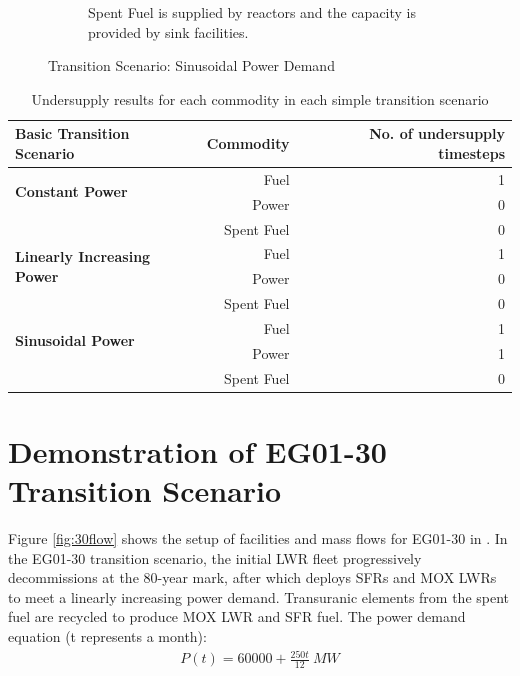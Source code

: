 \begin{figure}[]
\begin{subfigure}[t]{0.6\textwidth}
            \caption{Spent Fuel is supplied by reactors and the capacity is provided by sink facilities.}
            \label{fig:sinetransition-spentfuel}
        \end{subfigure}
        \caption{Transition Scenario: Sinusoidal Power Demand}
    \end{figure}

    \begin{table}[]
        \centering
        \caption {Undersupply results for each commodity in each simple transition scenario}
        \label{tab:transition-scenario-results}
            \footnotesize
            \begin{tabular}{l|rr}	
                \hline
                \textbf{Basic Transition Scenario}    & \textbf{Commodity}    & \textbf{No. of undersupply timesteps} \\ \hline
                \multirow{2}{*}{\textbf{Constant Power}} & Fuel & 1 \\ 
                                                         & Power & 0 \\ 
                                                         & Spent Fuel & 0 \\ \hline
                \multirow{2}{*}{\textbf{Linearly Increasing Power}} & Fuel & 1 \\ 
                                                         & Power & 0 \\ 
                                                         & Spent Fuel & 0 \\ \hline
                \multirow{2}{*}{\textbf{Sinusoidal Power}} & Fuel & 1 \\ 
                                                         & Power & 1 \\ 
                                                         & Spent Fuel & 0 \\ \hline
                \end{tabular}
    \end{table}

\section{\deploy Demonstration of EG01-30 Transition Scenario} 
\label{sec:eg01-30}
Figure \ref{fig:30flow} shows the setup of facilities and mass flows 
for EG01-30 in \Cyclus. 
In the EG01-30 transition scenario, the initial LWR fleet 
progressively decommissions at the 80-year mark,
after which \deploy deploys \glspl{SFR} and \gls{MOX} \glspl{LWR} to 
meet a linearly increasing power demand. 
Transuranic elements from the spent fuel are recycled to 
produce \gls{MOX} \gls{LWR} and \gls{SFR} fuel. 
The power demand equation (t represents a month): 
\begin{align}
    P(t) = 60000 + \frac{250t}{12}\ MW
\end{align}


